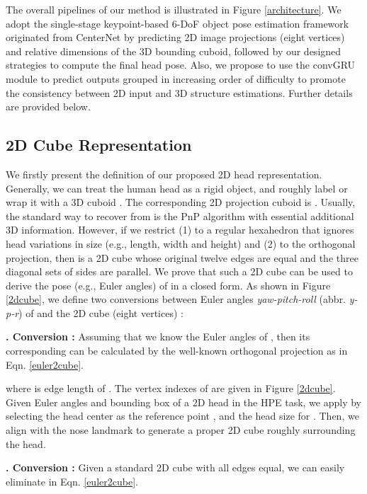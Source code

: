 \documentclass{article}
\begin{document}
The overall pipelines of our method is illustrated in Figure \ref{architecture}. We adopt the single-stage keypoint-based 6-DoF object pose estimation framework originated from CenterNet \cite{zhou2019objects} by predicting 2D image projections (eight vertices) and relative dimensions of the 3D bounding cuboid, followed by our designed strategies to compute the final head pose. Also, we propose to use the convGRU module \cite{ballas2016delving, gao2022monocular} to predict outputs grouped in increasing order of difficulty to promote the consistency between 2D input and 3D structure estimations. Further details are provided below.


\subsection{2D Cube Representation}

We firstly present the definition of our proposed 2D head representation. Generally, we can treat the human head  as a rigid object, and roughly label or wrap it with a 3D cuboid . The corresponding 2D projection cuboid is . Usually, the standard way to recover  from  is the PnP algorithm \cite{lepetit2009epnp} with essential additional 3D information. However, if we restrict (1)  to a regular hexahedron that ignores head variations in size (e.g., length, width and height) and (2)  to the orthogonal projection, then  is a 2D cube whose original twelve edges are equal and the three diagonal sets of sides are parallel. We prove that such a 2D cube  can be used to derive the pose (e.g., Euler angles) of  in a closed form. As shown in Figure \ref{2dcube}, we define two conversions between Euler angles {\it yaw-pitch-roll} (abbr. {\it y-p-r}) of  and the 2D cube (eight vertices) :

{\bf {}. Conversion :} Assuming that we know the Euler angles of , then its corresponding  can be calculated by the well-known orthogonal projection as in Eqn. \ref{euler2cube}.

where  is edge length of . The vertex indexes of  are given in Figure \ref{2dcube}. Given Euler angles and bounding box of a 2D head in the HPE task, we apply  by selecting the head center as the reference point , and the head size for . Then, we align  with the nose landmark to generate a proper 2D cube roughly surrounding the head.


{\bf {}. Conversion :} Given a standard 2D cube  with all edges equal, we can easily eliminate  in Eqn. \ref{euler2cube}.
\end{document}
